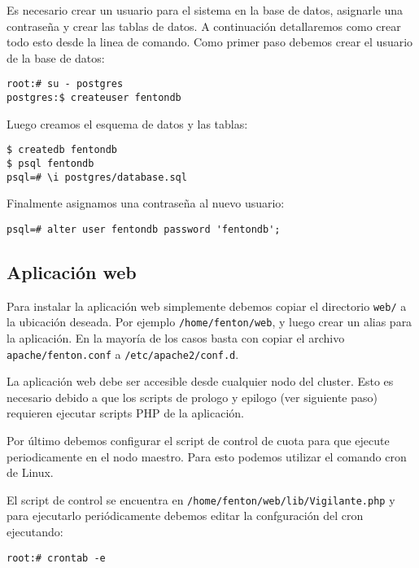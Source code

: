 \documentclass[a4paper,10pt,spanish]{article}
\begin{document}
Es necesario crear un usuario para el sistema en la base de datos, asignarle una contrase\~{n}a y crear las tablas de datos. A continuaci\'{o}n detallaremos como crear todo esto desde la linea de comando. Como primer paso debemos crear el usuario de la base de datos:

\begin{verbatim}
root:# su - postgres 
postgres:$ createuser fentondb 
\end{verbatim}

Luego creamos el esquema de datos y las tablas:

\begin{verbatim}
$ createdb fentondb 
$ psql fentondb
psql=# \i postgres/database.sql
\end{verbatim}

Finalmente asignamos una contrase\~{n}a al nuevo usuario:

\begin{verbatim}
psql=# alter user fentondb password 'fentondb';
\end{verbatim}

\subsection{Aplicaci\'{o}n web}

Para instalar la aplicaci\'{o}n web simplemente debemos copiar el directorio \mbox{\texttt{web/}} a la ubicaci\'{o}n deseada. Por ejemplo \mbox{\texttt{/home/fenton/web}}, y luego crear un alias para la aplicaci\'{o}n. En la mayor\'{i}a de los casos basta con copiar el archivo \mbox{\texttt{apache/fenton.conf}} a \mbox{\texttt{/etc/apache2/conf.d}}.

La aplicaci\'{o}n web debe ser accesible desde cualquier nodo del cluster. Esto es necesario debido a que los scripts de prologo y epilogo (ver siguiente paso) requieren ejecutar scripts PHP de la aplicaci\'{o}n.

Por \'{u}ltimo debemos configurar el script de control de cuota para que ejecute periodicamente en el nodo maestro. Para esto podemos utilizar el comando cron de Linux. 

El script de control se encuentra en \mbox{\texttt{/home/fenton/web/lib/Vigilante.php}} y para ejecutarlo peri\'{o}dicamente debemos editar la confguraci\'{o}n del cron ejecutando:

\begin{verbatim}
root:# crontab -e
\end{verbatim}
\end{document}
